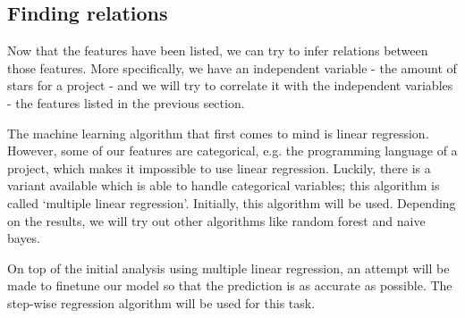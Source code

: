    
    \subsection{Finding relations}
        Now that the features have been listed, we can try to infer relations between those features. More specifically, we have an independent variable - the amount of stars for a project - and we will try to correlate it with the independent variables - the features listed in the previous section.
        
        The machine learning algorithm that first comes to mind is linear regression. However, some of our features are categorical, e.g. the programming language of a project, which makes it impossible to use linear regression.
        Luckily, there is a variant available which is able to handle categorical variables; this algorithm is called `multiple linear regression'. 
        Initially, this algorithm will be used. Depending on the results, we will try out other algorithms like random forest and naive bayes.
        
        On top of the initial analysis using multiple linear regression, an attempt will be made to finetune our model so that the prediction is as accurate as possible. The step-wise regression algorithm will be used for this task.
    
